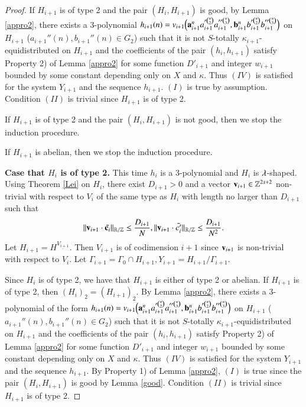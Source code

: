 \documentclass[12pt,amstex]{amsart}
\theoremstyle{definition}
\def \D {\kappa}
\def \c {\bold{c}}
\def \a {\bold{a}}
\def \b {\bold{b}}
\def \v {\bold{v}}
\def \l {\bold{\lambda}}
\begin{document}
\begin{proof}
If $H_{i+1}$ is of type 2 and the pair $(H_{i},H_{i+1})$ is good, by Lemma \ref{appro2}, there exists
 a 3-polynomial $h_{i+1}(n)=v_{i+1}\Bigl(\a_{i+1}^{n}a_{i+1}'^{\binom{n}{2}}a_{i+1}''^{\binom{n}{3}},\b_{i+1}^{n}b_{i+1}'^{\binom{n}{2}}b_{i+1}''^{\binom{n}{3}}\Bigr)$
on $H_{i+1}$ ($a_{i+1}''(n),b_{i+1}''(n)\in G_{2}$) such that it is not $S$-totally $\D_{i+1}$-equidistributed on $H_{i+1}$ and the coefficients of the pair $(h_{i},h_{i+1})$ satisfy Property 2) of Lemma \ref{appro2}
for some function $D'_{i+1}$ and integer $w_{i+1}$ bounded by some constant depending only on $X$ and $\D$.  Thus $(IV)$ is
satisfied for the system $Y_{i+1}$ and the sequence $h_{i+1}$. $(I)$ is true by assumption. Condition $(II)$ is trivial since $H_{i+1}$ is of type 2.

If $H_{i+1}$ is of type 2 and the pair $(H_{i},H_{i+1})$ is not good, then we stop the induction procedure.

If $H_{i+1}$ is abelian, then we stop the induction procedure.

\textbf{Case that $H_{i}$ is of type 2.} This time $h_{i}$ is a 3-polynomial and $H_{i}$ is $\l$-shaped. Using Theorem \ref{Lei} on $H_{i}$,
there exist $D_{i+1}>0$ and a vector $\v_{i+1}\in\mathbb{Z}^{2s+2}$ non-trivial with respect to $V_{i}$ of the same type as $H_{i}$ with length no larger than $D_{i+1}$ such that
\begin{equation}\nonumber
    \begin{split}
     \Vert \v_{i+1}\cdot\tilde{\c_{i}}\Vert_{\mathbb{R}/\mathbb{Z}}\leq\frac{D_{i+1}}{N}, \Vert \v_{i+1}\cdot \tilde{c'_{i}}\Vert_{\mathbb{R}/\mathbb{Z}}\leq\frac{D_{i+1}}{N^{2}}.
    \end{split}
  \end{equation}
  Let $H_{i+1}=H^{\underline{V_{i+1}}}$. Then $V_{i+1}$ is of codimension $i+1$ since $\v_{i+1}$ is non-trivial with respect to $V_{i}$. Let
 $\Gamma_{i+1}=\Gamma_{0}\cap H_{i+1}, Y_{i+1}=H_{i+1}/\Gamma_{i+1}$.

 Since $H_{i}$ is of type 2, we have that $H_{i+1}$ is either of type 2 or abelian. If $H_{i+1}$ is of type 2, then $(H_{i})_{2}=(H_{i+1})_{2}$. By
 Lemma \ref{appro2}, there exists
 a 3-polynomial of the form $h_{i+1}(n)=v_{i+1}\Bigl(\a_{i+1}^{n}a_{i+1}'^{\binom{n}{2}}a_{i+1}''^{\binom{n}{3}},\b_{i+1}^{n}b_{i+1}'^{\binom{n}{2}}b_{i+1}''^{\binom{n}{3}}\Bigr)$
on $H_{i+1}$ ($a_{i+1}''(n),b_{i+1}''(n)\in G_{2}$)  such that it is not $S$-totally $\D_{i+1}$-equidistributed on $H_{i+1}$ and the coefficients of the pair
$(h_{i},h_{i+1})$ satisfy Property 2) of Lemma \ref{appro2}
for some function $D'_{i+1}$ and integer $w_{i+1}$ bounded by some constant depending only on $X$ and $\D$. Thus $(IV)$ is
satisfied for the system $Y_{i+1}$ and the sequence $h_{i+1}$. By Property 1) of Lemma \ref{appro2}, $(I)$ is true since the pair $(H_{i},H_{i+1})$ is good by
Lemma \ref{good}. Condition $(II)$ is trivial since $H_{i+1}$ is of type 2.


\end{proof}
\end{document}
